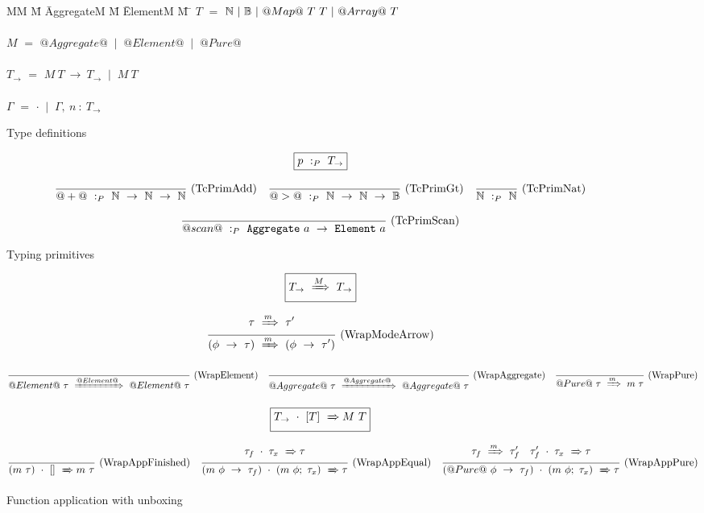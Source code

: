 
\begin{figure}

\begin{tabbing}
MM \= M \= AggregateM \= M \= ElementM \= M \= \kill
$T$
    \> $=$  \> $\mathbb{N}~|~\mathbb{B}~|~@Map@~T~T~|~@Array@~T$ \\
\\
$M$
    \> $=$  \> $@Aggregate@$ \> $~|~$ \> $@Element@$ \> $~|~$ \> $@Pure@$         \\
\\
$T_{\to}$
    \> $=$  
            \> $M~T~\to~T_{\to}$
            \> $~|~$
            \> $M~T$ \\
\\
$\Gamma$
    \> $=$  
            \> $\cdot$
            \> $~|~$
            \> $\Gamma,~n~:~T_\to$ \\
\end{tabbing}

\caption{Type definitions}
\label{fig:source:type:defs}
\end{figure}


\begin{figure*}

$$
\boxed{p ~:_{P}~ T_\to}
$$


$$
\frac {\displaystyle 
} {\displaystyle  
    @+@ ~:_{P}~ \mathbb{N}~\to~\mathbb{N}~\to~\mathbb{N}
} \ 
\textrm{(TcPrimAdd)}
\quad
\frac {\displaystyle 
} {\displaystyle 
    @>@ ~:_{P}~ \mathbb{N}~\to~\mathbb{N}~\to~\mathbb{B}
} \ 
\textrm{(TcPrimGt)}
\quad
\frac {\displaystyle 
} {\displaystyle  
    \mathbb{N} ~:_{P}~ \mathbb{N}
} \ 
\textrm{(TcPrimNat)}
$$

$$
\frac {\displaystyle 
} {\displaystyle  
    @scan@ ~:_{P}~ \mathtt{Aggregate}~a~\to~\mathtt{Element}~a
} \ 
\textrm{(TcPrimScan)}
$$

\caption{Typing primitives}
\label{fig:source:type:prim}
\end{figure*}


\begin{figure*}

$$
\boxed{T_{\to} ~\xRightarrow{M}~ T_{\to}}
$$

$$
\frac {\displaystyle 
    \tau ~\xRightarrow{m}~ \tau'
} {\displaystyle 
    (\phi~\to~\tau) ~\xRightarrow{m}~ (\phi~\to~\tau')
} \ 
\textrm{(WrapModeArrow)}
$$

$$
\frac {\displaystyle  } {\displaystyle 
    @Element@~\tau ~\xRightarrow{@Element@}~ @Element@~\tau
} \ 
\textrm{(WrapElement)}
\quad
\frac {\displaystyle  } {\displaystyle 
    @Aggregate@~\tau ~\xRightarrow{@Aggregate@}~ @Aggregate@~\tau
} \ 
\textrm{(WrapAggregate)}
\quad
\frac {\displaystyle  } {\displaystyle 
    @Pure@~\tau ~\xRightarrow{m}~ m~\tau
} \ 
\textrm{(WrapPure)}
$$


$$
\boxed{T_{\to}~\cdot~[T] ~\xRightarrow~ M~T}
$$

$$
\frac {\displaystyle 
} {\displaystyle 
    (m~\tau)~\cdot~[] ~\xRightarrow~ m~\tau
} \ 
\textrm{(WrapAppFinished)}
\quad
\frac {\displaystyle 
    \tau_f~\cdot~\tau_x ~\xRightarrow~ \tau
} {\displaystyle 
    (m~\phi~\to~\tau_f)~\cdot~(m~\phi;~\tau_x) ~\xRightarrow~ \tau
} \ 
\textrm{(WrapAppEqual)}
\quad
\frac {\displaystyle 
    \tau_f ~\xRightarrow{m}~ \tau_f'
    \quad
    \tau_f'~\cdot~\tau_x ~\xRightarrow~ \tau
} {\displaystyle 
    (@Pure@~\phi~\to~\tau_f)~\cdot~(m~\phi;~\tau_x) ~\xRightarrow~ \tau
} \ 
\textrm{(WrapAppPure)}
$$

\caption{Function application with unboxing}
\label{fig:source:type:wrap}
\end{figure*}


